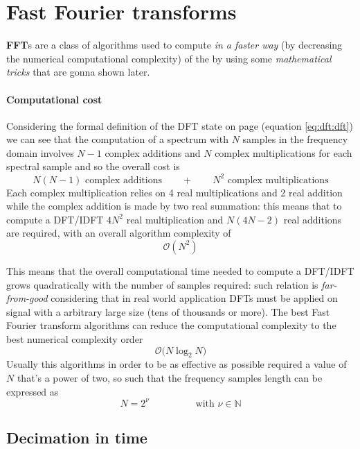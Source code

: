 \section{Fast Fourier transforms}
	
	 \textbf{FFT}s are a class of algorithms used to compute \textit{in a faster way} (by decreasing the numerical computational complexity) of the \dft by using some \textit{mathematical tricks} that are gonna shown later.
	
	\paragraph{Computational cost} Considering the formal definition of the DFT state on page \pageref{eq:dft:dft} (equation \ref{eq:dft:dft}) we can see that the computation of a spectrum with $N$ samples in the frequency domain involves $N-1$ complex additions and $N$ complex multiplications for each spectral sample and so the overall cost is
	\[ N(N-1) \text{ complex additions} \qquad + \qquad N^2 \text{ complex multiplications} \]
	Each complex multiplication relies on 4 real multiplications and 2 real addition while the complex addition is made by two real summation: this means that to compute a DFT/IDFT $4N^2$ real multiplication and $N(4N-2)$ real additions are required, with an overall algorithm complexity of 
	\[ \mathcal O(N^2 ) \]
	
	This means that the overall computational time needed to compute a DFT/IDFT grows quadratically with the number of samples required: such relation is \textit{far-from-good} considering that in real world application DFTs must be applied on signal with a arbitrary large size (tens of thousands or more). The best Fast Fourier transform algorithms can reduce the computational complexity to the best numerical complexity order
	\[ \mathcal O\big( N \log_2N \big) \]
	Usually this algorithms in order to  be as effective as possible required a value of $N$ that's a power of two, so such that the frequency samples length can be expressed as
	\begin{equation} \label{eq:dft:pow2}
		 N = 2^\nu \hspace{2cm} \textrm{with } \nu \in \mathds N
	\end{equation}
	
	\subsection{Decimation in time}
		
